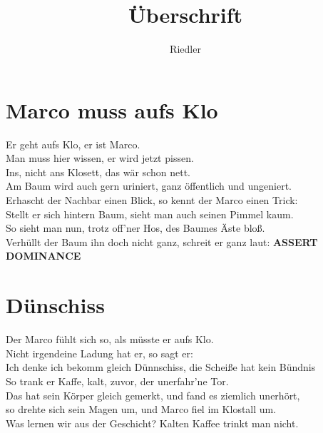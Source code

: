 \documentclass[11pt]{article}
\title{\textbf{Überschrift}}
\author{Riedler}
\date{}
\begin{document}
\maketitle
\thispagestyle{empty}

\section*{Marco muss aufs Klo}

Er geht aufs Klo, er ist Marco.\\
Man muss hier wissen, er wird jetzt pissen.\\
Ins, nicht ans Klosett, das wär schon nett.\\
Am Baum wird auch gern uriniert, ganz öffentlich und ungeniert.\\
Erhascht der Nachbar einen Blick, so kennt der Marco einen Trick:\\
Stellt er sich hintern Baum, sieht man auch seinen Pimmel kaum.\\
So sieht man nun, trotz off'ner Hos, des Baumes Äste bloß.\\
Verhüllt der Baum ihn doch nicht ganz, schreit er ganz laut: \textbf{ASSERT DOMINANCE}

\section*{Dünschiss}

Der Marco fühlt sich so, als müsste er aufs Klo.\\
Nicht irgendeine Ladung hat er, so sagt er:\\
Ich denke ich bekomm gleich Dünnschiss, die Scheiße hat kein Bündnis\\
So trank er Kaffe, kalt, zuvor, der unerfahr'ne Tor.\\
Das hat sein Körper gleich gemerkt, und fand es ziemlich unerhört,\\
so drehte sich sein Magen um, und Marco fiel im Klostall um.\\
Was lernen wir aus der Geschicht? Kalten Kaffee trinkt man nicht.
\end{document}
